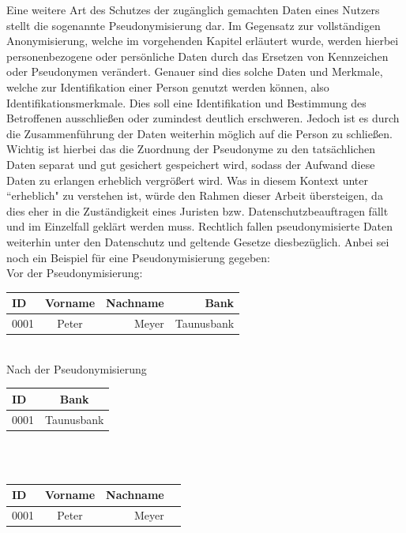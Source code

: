 \documentclass[a4paper, 12pt]{article}
\begin{document}
Eine weitere Art des Schutzes der zugänglich gemachten Daten eines Nutzers stellt die sogenannte Pseudonymisierung dar. Im Gegensatz zur vollständigen Anonymisierung, welche im vorgehenden Kapitel erläutert wurde, werden hierbei personenbezogene oder persönliche Daten durch das Ersetzen von Kennzeichen oder Pseudonymen verändert. Genauer sind dies solche Daten und Merkmale, welche zur Identifikation einer Person genutzt werden können, also Identifikationsmerkmale. Dies soll eine Identifikation und Bestimmung des Betroffenen ausschließen oder zumindest deutlich erschweren. Jedoch ist es durch die Zusammenführung der Daten weiterhin möglich auf die Person zu schließen. Wichtig ist hierbei das die Zuordnung der Pseudonyme zu den tatsächlichen Daten separat und gut gesichert gespeichert wird, sodass der Aufwand diese Daten zu erlangen erheblich vergrößert wird. Was in diesem Kontext unter ``erheblich" zu verstehen ist, würde den Rahmen dieser Arbeit übersteigen, da dies eher in die Zuständigkeit eines Juristen bzw. Datenschutzbeauftragen fällt und im Einzelfall geklärt werden muss. Rechtlich fallen pseudonymisierte Daten weiterhin unter den Datenschutz und geltende Gesetze diesbezüglich.
\cite{thesing_anonym_pseudonym, datenschutz_pseudonymisierung}
\newpage
\noindent Anbei sei noch ein Beispiel für eine Pseudonymisierung gegeben:\\
\noindent Vor der Pseudonymisierung:\\

\begin{tabular}{lcrr}
	
	ID & Vorname & Nachname & Bank \\
	\hline
	0001 & Peter & Meyer & Taunusbank
	
\end{tabular}\vspace{10mm}\\

\noindent Nach der Pseudonymisierung\\

\begin{tabular}{lc}
	
	ID & Bank \\
	\hline
	0001 & Taunusbank
	
\end{tabular}\vspace{10mm}\\\\

\begin{tabular}{lcrr}
	
	ID & Vorname & Nachname\\
	\hline
	0001 & Peter & Meyer
	
\end{tabular}\vspace{10mm}
\newpage
\end{document}
